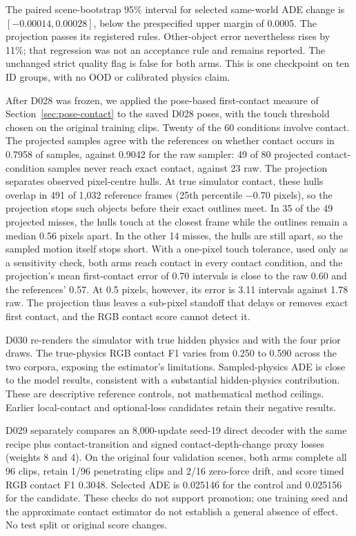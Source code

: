 \documentclass[11pt,a4paper]{article}
\begin{document}
The paired scene-bootstrap 95\% interval for selected same-world ADE change
is $[-0.00014,0.00028]$, below the prespecified upper margin of 0.0005.
The projection passes its registered rules. Other-object error nevertheless
rises by 11\%; that regression was not an acceptance rule and remains reported.
The unchanged strict quality flag is false for both arms. This is one checkpoint
on ten ID groups, with no OOD or calibrated physics claim.

After D028 was frozen, we applied the pose-based first-contact measure of
Section~\ref{sec:pose-contact} to the saved D028 poses, with the touch threshold
chosen on the original training clips. Twenty of the 60 conditions involve
contact. The projected samples agree with the references on whether contact
occurs in 0.7958 of samples, against 0.9042 for the raw sampler: 49 of 80
projected contact-condition samples never reach exact contact, against 23 raw.
The projection separates observed pixel-centre hulls. At true simulator contact,
these hulls overlap in 491 of 1,032 reference frames (25th percentile $-0.70$
pixels), so the projection stops such objects before their exact outlines meet.
In 35 of the 49 projected misses, the hulls touch at the closest frame while the
outlines remain a median 0.56 pixels apart. In the other 14 misses, the hulls
are still apart, so the sampled motion itself stops short. With a one-pixel touch
tolerance, used only as a sensitivity check, both arms reach contact in every
contact condition, and the projection's mean first-contact error of 0.70
intervals is close to the raw 0.60 and the references' 0.57. At 0.5 pixels,
however, its error is 3.11 intervals against 1.78 raw. The projection thus
leaves a sub-pixel standoff that delays or removes exact first contact, and the
RGB contact score cannot detect it.

D030 re-renders the simulator with true hidden physics and with the four prior
draws. The true-physics RGB contact F1 varies from 0.250 to 0.590 across the two
corpora, exposing the estimator's limitations. Sampled-physics ADE is close
to the model results, consistent with a substantial hidden-physics contribution.
These are descriptive reference controls, not mathematical method ceilings.
Earlier local-contact and optional-loss candidates retain their negative results.

D029 separately compares an 8,000-update seed-19 direct decoder with the same recipe plus contact-transition and signed contact-depth-change proxy losses (weights 8 and 4). On the original four validation scenes, both arms complete all 96 clips, retain 1/96 penetrating clips and 2/16 zero-force drift, and score timed RGB contact F1 0.3048. Selected ADE is 0.025146 for the control and 0.025156 for the candidate. These checks do not support promotion; one training seed and the approximate contact estimator do not establish a general absence of effect. No test split or original score changes.
\end{document}

